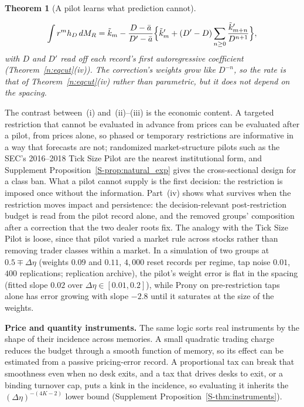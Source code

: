 \documentclass[11pt,letterpaper]{article}
\newtheorem{theorem}{Theorem}[section]
\theoremstyle{definition}
\begin{document}
\begin{theorem}[A pilot learns what prediction cannot]
\begin{enumerate}
  \[
    \int r^m h_D\, dM_R = \tilde k_m - \frac{D - \bar a}{D' - \bar a}\Bigl\{\tilde k'_m + (D' - D) \sum_{n \ge 0} \frac{\tilde k'_{m+n}}{D^{n+1}}\Bigr\},
  \]
  with $D$ and $D'$ read off each record's first autoregressive coefficient (Theorem~\ref{n:eqcut}(iv)). The correction's weights grow like $D^{-n}$, so the rate is that of Theorem~\ref{n:eqcut}(iv) rather than parametric, but it does not depend on the spacing.
\end{enumerate}
\end{theorem}

The contrast between~(i) and~(ii)--(iii) is the economic content. A targeted restriction that cannot be evaluated in advance from prices can be evaluated after a pilot, from prices alone, so phased or temporary restrictions are informative in a way that forecasts are not; randomized market-structure pilots such as the SEC's 2016--2018 Tick Size Pilot are the nearest institutional form, and Supplement Proposition~\ref{S-prop:natural_exp} gives the cross-sectional design for a class ban. What a pilot cannot supply is the first decision: the restriction is imposed once without the information. Part~(iv) shows what survives when the restriction moves impact and persistence: the decision-relevant post-restriction budget is read from the pilot record alone, and the removed groups' composition after a correction that the two dealer roots fix. The analogy with the Tick Size Pilot is loose, since that pilot varied a market rule across stocks rather than removing trader classes within a market. In a simulation of two groups at $0.5 \mp \Delta\eta$ (weights $0.09$ and $0.11$, $4{,}000$ reset records per regime, tap noise $0.01$, $400$ replications; replication archive), the pilot's weight error is flat in the spacing (fitted slope $0.02$ over $\Delta\eta \in [0.01, 0.2]$), while Prony on pre-restriction taps alone has error growing with slope $-2.8$ until it saturates at the size of the weights.




\textbf{Price and quantity instruments.} The same logic sorts real instruments by the shape of their incidence across memories. A small quadratic trading charge reduces the budget through a smooth function of memory, so its effect can be estimated from a passive pricing-error record. A proportional tax can break that smoothness even when no desk exits, and a tax that drives desks to exit, or a binding turnover cap, puts a kink in the incidence, so evaluating it inherits the $(\Delta\eta)^{-(4K-2)}$ lower bound (Supplement Proposition~\ref{S-thm:instruments}).
\end{document}
